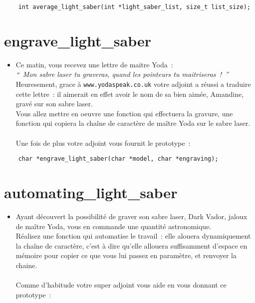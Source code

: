\documentclass{koala-en}
\begin{document}
\begin{lstlisting}
	int average_light_saber(int *light_saber_list, size_t list_size);
\end{lstlisting}

\newpage
\chapter{engrave\_light\_saber}


\begin{itemize}
	\item	Ce matin, vous recevez une lettre de maitre Yoda~:\\
			\textit{``~Mon sabre laser tu graveras, quand les pointeurs tu maitriseras~!~''}\\
		Heuresement, grace à \texttt{www.yodaspeak.co.uk} votre adjoint a réussi a traduire cette lettre~: il aimerait en effet avoir le nom de sa bien aimée, Amandine, gravé sur son sabre laser.\\
		Vous allez mettre en oeuvre une fonction qui effectuera la gravure, une fonction qui copiera la chaîne de caractère de maître Yoda sur le sabre laser.\\\\
		Une fois de plus votre adjoint vous fournit le prototype~:
\end{itemize}

\begin{lstlisting}
	char *engrave_light_saber(char *model, char *engraving); 
\end{lstlisting}


\newpage
\chapter{automating\_light\_saber}

\begin{itemize}
	\item	Ayant découvert la possibilité de graver son sabre laser, Dark Vador, jaloux de maître Yoda, vous en commande une quantité astronomique. \\
		Réalisez une fonction qui automatise le travail~: elle alouera dynamiquement la chaîne de caractère, c'est à dire qu'elle allouera suffisamment d'espace en mémoire pour copier ce que vous lui passez en paramètre, et renvoyer la chaine.\\\\
		Comme d'habitude votre super adjoint vous aide en vous donnant ce prototype~: 
\end{itemize}
\end{document}
